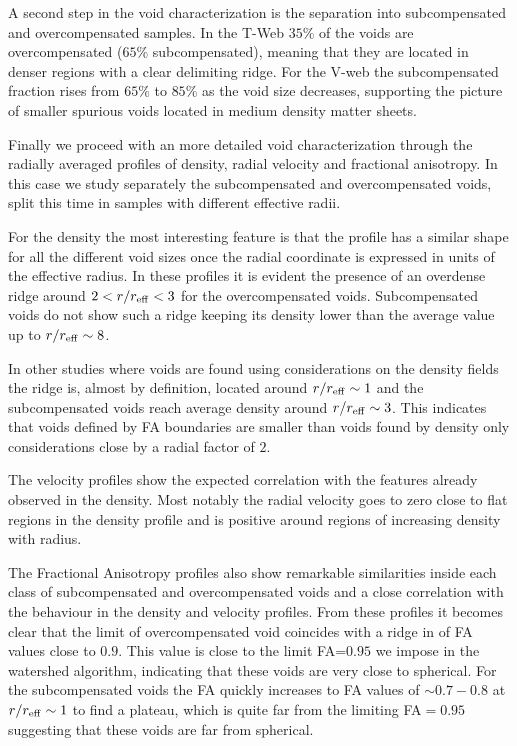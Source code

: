 \documentclass[a4,useAMS,usenatbib,usegraphicx]{mn2e}
\begin{document}
A second step in the void characterization 
is the separation into subcompensated and overcompensated samples. 
In the T-Web $35\%$ of the voids are overcompensated ($65\%$
subcompensated), meaning that they are located in denser regions with
a clear delimiting ridge.   
For the V-web the subcompensated fraction rises from $65\%$ to $85\%$ as the
void size decreases, supporting the picture of smaller spurious voids
located in medium density matter sheets.   

Finally we proceed with an more detailed void characterization
through the radially averaged profiles of density, radial velocity and
fractional anisotropy. 
In this case we study separately the subcompensated and
overcompensated voids, split this time in samples with different
effective radii. 

For the density the most interesting feature is that the  profile has
a similar shape for all the different void sizes once the radial
coordinate is expressed in units of the effective radius.  
In these profiles it is evident the presence of an overdense ridge
around $2<r/r_{\rm eff}<3$ for the overcompensated voids.
Subcompensated voids do not show such a ridge keeping its density
lower than the average value up to $r/r_{\rm eff}\sim 8$.

In other studies where voids are found using considerations on the
density fields the ridge is, almost by definition, located around
$r/r_{\rm eff}\sim 1$ and the subcompensated voids reach average
density around $r/r_{\rm eff}\sim 3$. 
This indicates that voids defined by FA boundaries are smaller  than
voids found by density only considerations close by a radial factor of
$2$.   

The velocity profiles show the expected correlation with the features
already observed in the density.
Most notably the radial velocity goes to zero close to flat regions in
the density profile and is positive around regions of increasing
density with radius.  

The Fractional Anisotropy profiles also show remarkable similarities
inside each class of subcompensated and overcompensated voids
and a close correlation with the behaviour in the density and velocity
profiles. 
From these profiles it becomes clear that the limit of overcompensated
void coincides with a ridge in of FA values close to $0.9$. 
This value is close to the limit FA=$0.95$ we impose in the watershed
algorithm, indicating that these voids are very close to spherical.
For the subcompensated voids the FA quickly increases to FA values of 
$\sim 0.7-0.8$ at $r/r_{\rm eff}\sim 1$ to find a plateau, which is
quite far from the limiting FA$=0.95$ suggesting that these voids are
far from spherical. 
\end{document}
